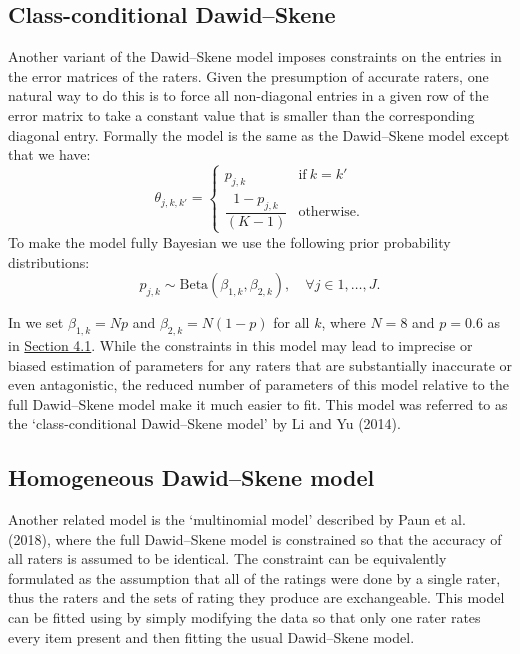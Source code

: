 \hypertarget{class-conditional-dawidskene}{%
\subsection{Class-conditional Dawid--Skene}\label{class-conditional-dawidskene}}

Another variant of the Dawid--Skene model imposes constraints on the
entries in the error matrices of the raters. Given the presumption of
accurate raters, one natural way to do this is to force all non-diagonal
entries in a given row of the error matrix to take a constant value that
is smaller than the corresponding diagonal entry. Formally the model is
the same as the Dawid--Skene model except that we have:
\[
    \theta_{j, k, k'} =
        \begin{cases}
            p_{j, k} & \text{if}\ k = k' \\
            \dfrac{1 - p_{j,k}}{(K - 1)} & \text{otherwise.}
        \end{cases}
\]
To make the model fully Bayesian we use the following prior probability
distributions:
\[
    p_{j, k} \sim \textrm{Beta}(\beta_{1,k}, \beta_{2,k}),
        \quad \forall j \in {1, \dots, J}.
\]

In  we set
\(\beta_{1, k} = N p\) and \(\beta_{2, k} = N(1 - p)\) for all \(k\), where
\(N = 8\) and \(p = 0.6\) as in \protect\hyperlink{sec:dawid-skene}{Section 4.1}. While the
constraints in this model may lead to imprecise or biased estimation of
parameters for any raters that are substantially inaccurate or even
antagonistic, the reduced number of parameters of this model relative to
the full Dawid--Skene model make it much easier to fit. This model was
referred to as the `class-conditional Dawid--Skene model' by Li and Yu (2014).

\hypertarget{sec:homogenous}{%
\subsection{Homogeneous Dawid--Skene model}\label{sec:homogenous}}

Another related model is the `multinomial model' described by Paun et al. (2018),
where the full Dawid--Skene model is constrained so that the accuracy of
all raters is assumed to be identical. The constraint can be
equivalently formulated as the assumption that all of the ratings were
done by a single rater, thus the raters and the sets of rating they
produce are exchangeable. This model can be fitted using
 by simply modifying the data so that only one rater rates every
item present and then fitting the usual Dawid--Skene model.


